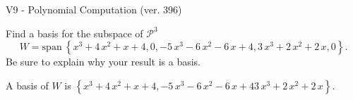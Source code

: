 \begin{exercise}
  \begin{exerciseTitle}V9 - Polynomial Computation (ver. 396)\end{exerciseTitle}
  \begin{exerciseStatement}
    Find a basis for the subspace of \(\mathcal{P}^3\) 
\[W=\mathrm{span}\ \left\{x^{3} + 4 \, x^{2} + x + 4 , 0 , -5 \, x^{3} - 6 \, x^{2} - 6 \, x + 4 , 3 \, x^{3} + 2 \, x^{2} + 2 \, x , 0\right\}.\]
 Be sure to explain why your result is a basis.


  \end{exerciseStatement}
  \begin{exerciseAnswer}
   A basis of \(W\) is  \(\left\{x^{3} + 4 \, x^{2} + x + 4 , -5 \, x^{3} - 6 \, x^{2} - 6 \, x + 4 3 \, x^{3} + 2 \, x^{2} + 2 \, x\right\}\).
  


  \end{exerciseAnswer}
\end{exercise}